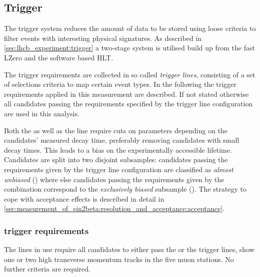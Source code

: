 \subsection{Trigger}
\label{sec:measurement_of_sin2beta:data_preparation:trigger}

The \LHCb trigger system reduces the amount of data to be stored using loose
criteria to filter events with interesting physical signatures. As described in
\cref{sec:lhcb_experiment:trigger} a two-stage system is utilised build up from
the fast \acf{LZero} and the software based \acf{HLT}.

The trigger requirements are collected in so called \emph{trigger lines},
consisting of a set of selections criteria to map certain event types. In the
following the trigger requirements applied in this measurement are described. If
not stated otherwise all candidates passing the requirements specified by the
trigger line configuration \TriggerReq are used in this analysis.

Both the \HLTOne \TrackMuon as well as the \HLTTwo \DiMuonDetachedJpsi line require
cuts on parameters depending on the candidates' measured decay time, preferably
removing candidates with small decay times. This leads to a bias on the
experimentally accessible lifetime. Candidates are split into two disjoint
subsamples: candidates passing the requirements given by the trigger line
configuration \TriggerReqAU are classified as \emph{almost unbiased}
(\textbf{\catAU}) where else candidates passing the requirements given by the
combination \TriggerReqEB correspond to the \emph{exclusively biased} subsample
(\textbf{\catEB}). The strategy to cope with acceptance effects is described in
detail in \cref{sec:measurement_of_sin2beta:resolution_and_acceptance:acceptance}.

\subsubsection{\LZero trigger requirements}
\label{sec:measurement_of_sin2beta:data_preparation:trigger:lzero}

The \HLT lines in use require all candidates to either pass the \LZeroMuon or
the \LZeroDiMuon trigger lines, \ie show one or two high transverse momentum
tracks in the five muon stations. No further \LZero criteria are required.

